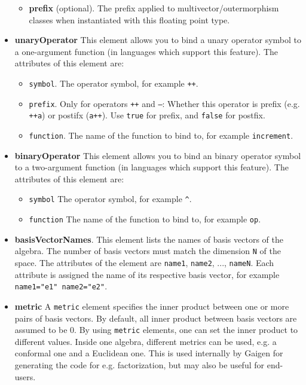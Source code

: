 \documentclass[10pt, a4paper]{article}
\begin{document}
\begin{itemize}
\begin{itemize}
            
       \item {\bf prefix} (optional). The prefix applied to multivector/outermorphism classes when instantiated with this
            floating point type.
            
       \end{itemize}
       
\item {\bf unaryOperator} This element allows you to bind a unary operator symbol to a one-argument function (in
      languages which support this feature). The attributes of this element are:
       \begin{itemize}
       \item {\tt symbol}. The operator symbol, for example {\tt ++}.
       \item {\tt prefix}. Only for operators {\tt ++} and {\tt --}:
            Whether this operator is prefix (e.g. {\tt ++a}) or postifx ({\tt a++}). Use {\tt true}
            for prefix, and {\tt false} for postfix. 
       \item {\tt function}. The name of the function to bind to, for example {\tt increment}.
       \end{itemize}
         
\item {\bf binaryOperator} This element allows you to bind an binary operator symbol to a two-argument function (in
      languages which support this feature). The attributes of this element are:
       \begin{itemize}
         \item {\tt symbol} The operator symbol, for example {\tt ^}.
         \item  {\tt function} The name of the function to bind to, for example {\tt op}.
       \end{itemize}
       
\item {\bf basisVectorNames}. This element lists the names of basis vectors of the algebra. The number of basis vectors
      must match the dimension {\tt N} of the space. The attributes of the element are {\tt name1}, {\tt name2}, 
      ..., {\tt nameN}. Each attribute is assigned the name of its respective basis vector, for example {\tt name1="e1" name2="e2"}.
      
\item {\bf metric} A {\tt metric} element specifies the inner product between one or more pairs of basis vectors.
      By default, all inner product between basis vectors are assumed to be 0. By using {\tt metric} elements, one can
      set the inner product to different values. Inside one algebra, different metrics can be used, e.g. a conformal one and
      a Euclidean one. This is used internally by Gaigen for generating the code for e.g. factorization, but may also be
      useful for end-users.
      

\end{itemize}
\end{document}
